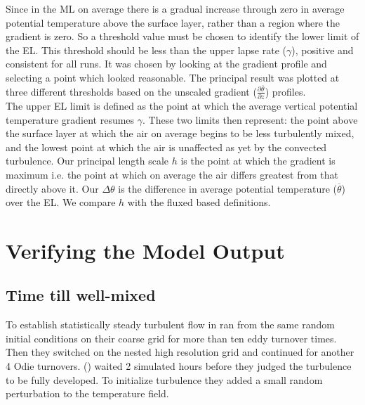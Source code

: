 Since in the \acs{ML} on average there is a gradual increase through zero in average potential temperature above the surface layer, rather than a region where the gradient is zero.  So a threshold value must be chosen to identify the lower limit of the \acs{EL}.  This threshold should be less than the upper lapse rate ($\gamma$), positive and consistent for all runs.  It was chosen by looking at the gradient profile and selecting a point which looked reasonable. The principal result was plotted at three different thresholds based on the unscaled gradient ($\frac{\partial \overline{\theta}}{\partial z}$) profiles.\\

The upper \acs{EL} limit is defined as the point at which the average vertical potential temperature gradient resumes $\gamma$.  These two limits then represent: the point above the surface layer at which the air on average begins to be less turbulently mixed, and the lowest point at which the air is unaffected as yet by the convected turbulence.  Our principal length scale $h$ is the point at which the gradient is maximum i.e. the point at which on average the air differs greatest from that directly above it. Our $\Delta \theta$ is the difference in average potential temperature ($\overline{\theta}$) over the \acs{EL}.  We compare $h$ with the fluxed based definitions.
  

\section{Verifying the Model Output}
\label{sec:CheckingtheModel}
\subsection{Time till well-mixed}%
\FloatBarrier

To establish statistically steady turbulent flow \citeauthor{SullMoengStev} in \cite{SullMoengStev}
ran from the same random initial conditions on their coarse grid for more than ten eddy turnover times.
Then they switched on the nested high resolution grid and continued for another 4 Odie turnovers.  
\citeauthor{BrooksFowler2} (\cite{BrooksFowler2}) waited 2 simulated hours before they
judged the turbulence to be fully developed.  To initialize turbulence they added a small random perturbation
to the temperature field.\\ 

